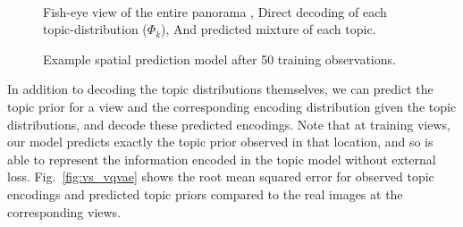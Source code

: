 \begin{figure}
\begin{minipage}{0.44\textwidth}
{        } \\
    \end{minipage}
    
    \caption{Example spatial prediction model after 50 training observations. \protect{}} Fish-eye view of the entire panorama \protect{}, Direct decoding of each topic-distribution ($\Phi_k$), And \protect{} predicted mixture of each topic.
    \label{fig:pano-24}
\end{figure}


In addition to decoding the topic distributions themselves, we can predict the topic prior for a view and the corresponding encoding distribution given the topic distributions, and decode these predicted encodings. Note that at training views, our model predicts exactly the topic prior observed in that location, and so is able to represent the information encoded in the topic model without external loss. Fig.~\ref{fig:vs_vqvae} shows the root mean squared error for observed topic encodings and predicted topic priors compared to the real images at the corresponding views.

